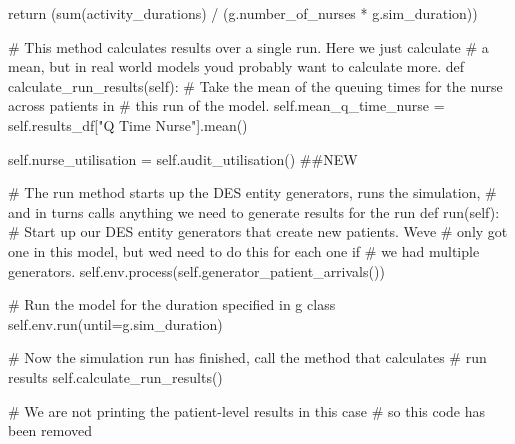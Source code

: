 \documentclass[
  letterpaper,
  DIV=11,
  numbers=noendperiod]{scrreprt}
\newenvironment{Shaded}{}{}
\newcommand{\BuiltInTok}[1]{\textcolor[rgb]{0.84,0.23,0.29}{#1}}
\newcommand{\CommentTok}[1]{\textcolor[rgb]{0.42,0.45,0.49}{#1}}
\newcommand{\ControlFlowTok}[1]{\textcolor[rgb]{0.84,0.23,0.29}{#1}}
\newcommand{\KeywordTok}[1]{\textcolor[rgb]{0.84,0.23,0.29}{#1}}
\newcommand{\NormalTok}[1]{\textcolor[rgb]{0.14,0.16,0.18}{#1}}
\newcommand{\OperatorTok}[1]{\textcolor[rgb]{0.14,0.16,0.18}{#1}}
\newcommand{\StringTok}[1]{\textcolor[rgb]{0.01,0.18,0.38}{#1}}
\newcommand{\VariableTok}[1]{\textcolor[rgb]{0.89,0.38,0.04}{#1}}
\begin{document}
\begin{tcolorbox}
\begin{Shaded}
\begin{Highlighting}[]
        \ControlFlowTok{return}\NormalTok{ (}\BuiltInTok{sum}\NormalTok{(activity\_durations) }\OperatorTok{/}\NormalTok{ (g.number\_of\_nurses }\OperatorTok{*}\NormalTok{ g.sim\_duration))}

    \CommentTok{\# This method calculates results over a single run.  Here we just calculate}
    \CommentTok{\# a mean, but in real world models you\textquotesingle{}d probably want to calculate more.}
    \KeywordTok{def}\NormalTok{ calculate\_run\_results(}\VariableTok{self}\NormalTok{):}
        \CommentTok{\# Take the mean of the queuing times for the nurse across patients in}
        \CommentTok{\# this run of the model.}
        \VariableTok{self}\NormalTok{.mean\_q\_time\_nurse }\OperatorTok{=} \VariableTok{self}\NormalTok{.results\_df[}\StringTok{"Q Time Nurse"}\NormalTok{].mean()}

        \VariableTok{self}\NormalTok{.nurse\_utilisation }\OperatorTok{=} \VariableTok{self}\NormalTok{.audit\_utilisation() }\CommentTok{\#\#NEW}


    \CommentTok{\# The run method starts up the DES entity generators, runs the simulation,}
    \CommentTok{\# and in turns calls anything we need to generate results for the run}
    \KeywordTok{def}\NormalTok{ run(}\VariableTok{self}\NormalTok{):}
        \CommentTok{\# Start up our DES entity generators that create new patients.  We\textquotesingle{}ve}
        \CommentTok{\# only got one in this model, but we\textquotesingle{}d need to do this for each one if}
        \CommentTok{\# we had multiple generators.}
        \VariableTok{self}\NormalTok{.env.process(}\VariableTok{self}\NormalTok{.generator\_patient\_arrivals())}

        \CommentTok{\# Run the model for the duration specified in g class}
        \VariableTok{self}\NormalTok{.env.run(until}\OperatorTok{=}\NormalTok{g.sim\_duration)}

        \CommentTok{\# Now the simulation run has finished, call the method that calculates}
        \CommentTok{\# run results}
        \VariableTok{self}\NormalTok{.calculate\_run\_results()}

        \CommentTok{\# We are not printing the patient{-}level results in this case}
        \CommentTok{\# so this code has been removed}


\end{Highlighting}
\end{Shaded}
\end{tcolorbox}
\end{document}
